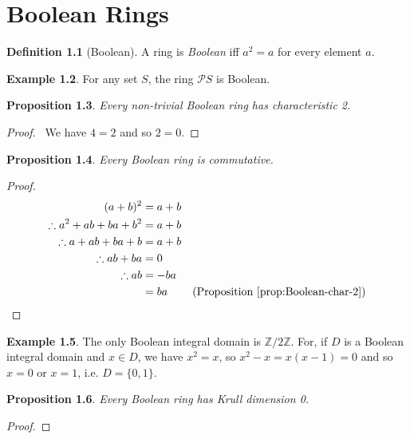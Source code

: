 \documentclass{book}
\let\qed\relax
\newtheorem{prop}{Proposition}[chapter]
\theoremstyle{definition}
\newtheorem{df}[prop]{Definition}
\newtheorem{ex}[prop]{Example}
\begin{document}
\chapter{Boolean Rings}

\begin{df}[Boolean]
A ring is \emph{Boolean} iff $a^2 = a$ for every element $a$.
\end{df}

\begin{ex}
For any set $S$, the ring $\mathcal{P} S$ is Boolean.
\end{ex}

\begin{prop}
\label{prop:Boolean-char-2}
Every non-trivial Boolean ring has characteristic 2.
\end{prop}

\begin{proof}
\pf\ We have $4 = 2$ and so $2 = 0$. \qed
\end{proof}

\begin{prop}
Every Boolean ring is commutative.
\end{prop}

\begin{proof}
\pf
\begin{align*}
(a+b)^2 & = a+b \\
\therefore a^2 + ab + ba + b^2 & = a+b \\
\therefore a + ab + ba + b & = a + b \\
\therefore ab + ba & = 0 \\
\therefore ab & = -ba \\
& = ba & (\text{Proposition \ref{prop:Boolean-char-2}})
\end{align*}
\end{proof}

\begin{ex}
The only Boolean integral domain is $\mathbb{Z} / 2 \mathbb{Z}$. For, if $D$ is a Boolean integral domain and $x \in D$, we have $x^2 = x$, so $x^2 - x = x(x-1) = 0$ and so $x = 0$ or $x = 1$, i.e. $D = \{0,1\}$.
\end{ex}

\begin{prop}
Every Boolean ring has Krull dimension 0.
\end{prop}

\begin{proof}
\pf
{}
\qed
\end{proof}
\end{document}
